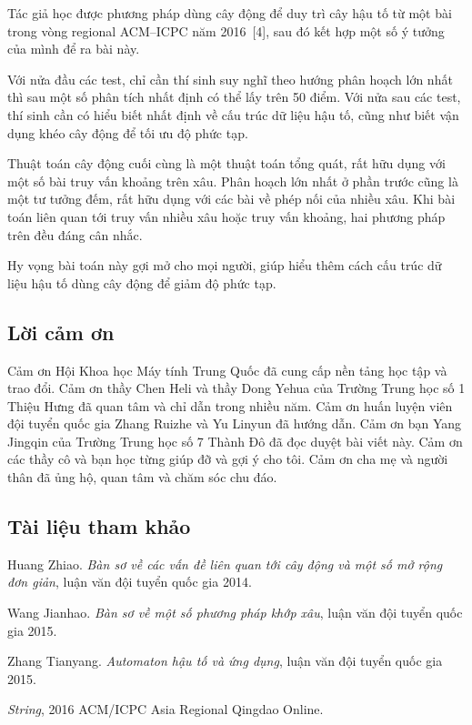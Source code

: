 \documentclass[11pt]{article}
\begin{document}
Tác giả học được phương pháp dùng cây động để duy trì cây hậu tố từ một bài
trong vòng regional ACM--ICPC năm 2016~[4], sau đó kết hợp một số ý tưởng của
mình để ra bài này.

Với nửa đầu các test, chỉ cần thí sinh suy nghĩ theo hướng phân hoạch lớn nhất
thì sau một số phân tích nhất định có thể lấy trên 50 điểm. Với nửa sau các
test, thí sinh cần có hiểu biết nhất định về cấu trúc dữ liệu hậu tố, cũng như
biết vận dụng khéo cây động để tối ưu độ phức tạp.

Thuật toán cây động cuối cùng là một thuật toán tổng quát, rất hữu dụng với
một số bài truy vấn khoảng trên xâu. Phân hoạch lớn nhất ở phần trước cũng là
một tư tưởng đếm, rất hữu dụng với các bài về phép nối của nhiều xâu. Khi bài
toán liên quan tới truy vấn nhiều xâu hoặc truy vấn khoảng, hai phương pháp
trên đều đáng cân nhắc.

Hy vọng bài toán này gợi mở cho mọi người, giúp hiểu thêm cách cấu trúc dữ
liệu hậu tố dùng cây động để giảm độ phức tạp.

\subsection{Lời cảm ơn}

Cảm ơn Hội Khoa học Máy tính Trung Quốc đã cung cấp nền tảng học tập và trao
đổi. Cảm ơn thầy Chen Heli và thầy Dong Yehua của Trường Trung học số 1 Thiệu
Hưng đã quan tâm và chỉ dẫn trong nhiều năm. Cảm ơn huấn luyện viên đội tuyển
quốc gia Zhang Ruizhe và Yu Linyun đã hướng dẫn. Cảm ơn bạn Yang Jingqin của
Trường Trung học số 7 Thành Đô đã đọc duyệt bài viết này. Cảm ơn các thầy cô
và bạn học từng giúp đỡ và gợi ý cho tôi. Cảm ơn cha mẹ và người thân đã ủng
hộ, quan tâm và chăm sóc chu đáo.

\subsection*{Tài liệu tham khảo}

\begin{enumerate}[label={[\arabic*]}]
  \item Huang Zhiao. \emph{Bàn sơ về các vấn đề liên quan tới cây động và một
  số mở rộng đơn giản}, luận văn đội tuyển quốc gia 2014.

  \item Wang Jianhao. \emph{Bàn sơ về một số phương pháp khớp xâu}, luận văn
  đội tuyển quốc gia 2015.

  \item Zhang Tianyang. \emph{Automaton hậu tố và ứng dụng}, luận văn đội
  tuyển quốc gia 2015.

  \item \emph{String}, 2016 ACM/ICPC Asia Regional Qingdao Online.
\end{enumerate}
\end{document}
